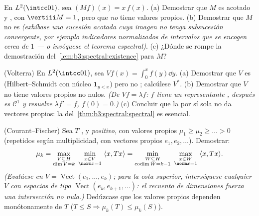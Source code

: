 \begin{exercise}[$\star\star$]\label{exo:b3:spectral:6}
En $L^2(\intcc01)$, sea $(Mf)(x) = x\,f(x)$. (a) Demostrar que $M$ es
acotado y , con
$\vertiii M =
1$, pero que \emph{no} tiene valores propios. (b) Demostrar que $M$ no
es  \emph{(exhíbase una
sucesión acotada cuya imagen no tenga subsucesión convergente, por
ejemplo indicadores normalizados de intervalos que se encogen cerca de
$1$ --- o invóquese el teorema espectral)}. (c) ¿Dónde se rompe la
demostración del~\cref{lem:b3:spectral:existence} para $M$?
\end{exercise}

\begin{exercise}[$\star\star$]\label{exo:b3:spectral:7}
(Volterra) En $L^2(\intcc01)$, sea $Vf(x) = \int_0^xf(y)\dd
y$. (a) Demostrar que $V$ es 
(Hilbert--Schmidt con núcleo $\mathbf
1_{y < x}$) pero no ;
calcúlese $V^*$. (b) Demostrar que $V$ no tiene valores propios no
nulos. \emph{(De $Vf =
\lambda f$: $f$ tiene un representante
, después es $\mathcal C^1$
y resuelve $\lambda f' = f$, $f(0) = 0$.)} (c) Concluir que la
 por sí sola no da vectores propios: la
del~\cref{thm:b3:spectral:spectral} es esencial.
\end{exercise}

\begin{exercise}[$\star\star\star$]\label{exo:b3:spectral:8}
(Courant--Fischer) Sea $T$ ,
 y \emph{positivo}, con
valores propios $\mu_1 \geq \mu_2 \geq \dots
> 0$ (repetidos según multiplicidad, con vectores propios $e_1, e_2,
\dots$). Demostrar:
\[
\mu_{k} = \max_{\substack{V \subseteq H \\ \dim V = k}}\
\min_{\substack{x \in V\\ \norm x = 1}}\ \langle x, Tx\rangle
= \min_{\substack{W \subseteq H\\ \operatorname{codim}W =
k-1}}\ \max_{\substack{x\in W\\ \norm x = 1}}\ \langle x,
Tx\rangle .
\]
\emph{(Evalúese en $V = \operatorname{Vect}(e_1,\dots,e_k)$; para la
cota superior, interséquese cualquier $V$ con espacios de tipo
$\operatorname{Vect}(e_k, e_{k+1}, \dots)$: el recuento de dimensiones
fuerza una intersección no nula.)} Dedúzcase que los valores propios
dependen monótonamente de $T$ ($T \leq S
\Rightarrow \mu_k(T) \leq \mu_k(S)$).
\end{exercise}

